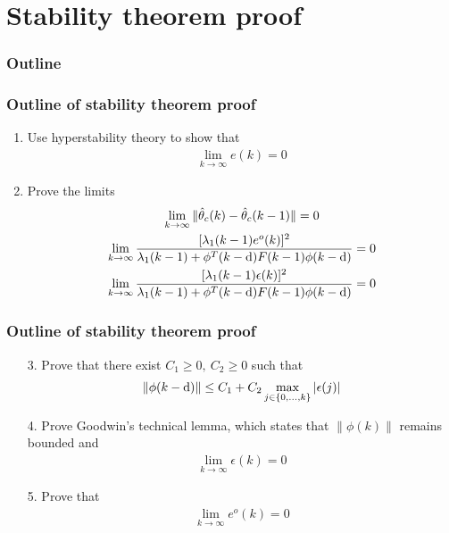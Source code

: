 \section{Stability theorem proof}
\begin{frame}
    \frametitle{Outline}
    \tableofcontents[currentsection]
\end{frame}

\begin{frame}
    \frametitle{Outline of stability theorem proof}

    \begin{enumerate}
        \item
        Use hyperstability theory to show that
        \begin{align*}
            \lim_{k \rightarrow \infty} e(k) = 0
        \end{align*}
        \pause

        \item
        Prove the limits
        \begin{gather*}
            \lim_{k \rightarrow \infty} \| \hat{\theta}_c(k) - \hat{\theta}_c(k-1) \| = 0 \\
            \lim_{k \rightarrow \infty} \frac{ [\lambda_1(k-1) e^o(k)]^2 }
                { \lambda_1(k-1) + \phi^T(k-\textrm{d}) F(k-1) \phi(k-\textrm{d}) } = 0 \\
            \lim_{k \rightarrow \infty} \frac{ [\lambda_1(k-1) \epsilon(k)]^2 }
                { \lambda_1(k-1) + \phi^T(k-\textrm{d}) F(k-1) \phi(k-\textrm{d}) } = 0
        \end{gather*}
    \end{enumerate}
\end{frame}

\begin{frame}
    \frametitle{Outline of stability theorem proof}

    \begin{enumerate}
        \item[3.]
        Prove that there exist $C_1 \geq 0, \ C_2 \geq 0$ such that
        \begin{align*}
            \| \phi(k-\textrm{d}) \| \leq C_1 + C_2 \max_{j \in \{0,\ldots,k\}} |\epsilon(j)|
        \end{align*}
        \pause

        \item[4.]
        Prove Goodwin's technical lemma, which states that $\| \phi(k) \|$ remains bounded and
        \begin{align*}
            \lim_{k \rightarrow \infty} \epsilon(k) = 0
        \end{align*}
        
        \item[5.]
        Prove that
        \begin{align*}
            \lim_{k \rightarrow \infty} e^o(k) = 0
        \end{align*}

    \end{enumerate}
\end{frame} 
